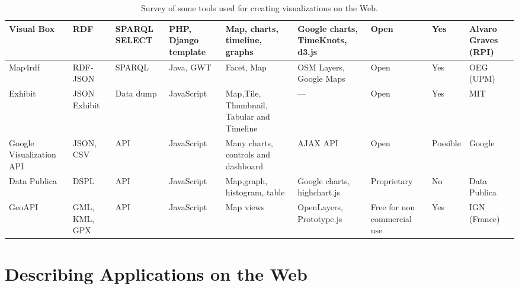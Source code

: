 \begin{landscape}
\begin{table}[htb]
\begin{tabularx}{\linewidth}{ |X|X|X|X|X|X|X|X|X|}
\hline
Visual Box & RDF & SPARQL SELECT& PHP, Django template& Map, charts, timeline, graphs & Google charts, TimeKnots, d3.js&  Open & Yes & Alvaro Graves (RPI) \\
\hline
Map4rdf & RDF- JSON & SPARQL & Java, GWT& Facet, Map & OSM Layers, Google Maps&  Open & Yes & OEG (UPM) \\
\hline
Exhibit & JSON Exhibit & Data dump& JavaScript& Map,Tile, Thumbnail, Tabular and Timeline & ---&  Open & Yes & MIT \\
\hline
Google Visualization API & JSON, CSV & API& JavaScript& Many charts, controls and dashboard & AJAX API&  Open & Possible & Google \\
\hline
Data Publica & DSPL & API& JavaScript& Map,graph, histogram, table & Google charts, highchart.js& Proprietary & No & Data Publica \\
\hline
GeoAPI & GML, KML, GPX & API& JavaScript& Map views & OpenLayers, Prototype.js& Free for non commercial use & Yes & IGN (France) \\
\hline
\end{tabularx}
\caption{Survey of some tools used for creating visualizations on the Web.}
\label{tab:visuTools}
\end{table}
\end{landscape}


\section{Describing Applications on the Web}
 \label{sec:descApps}
 
